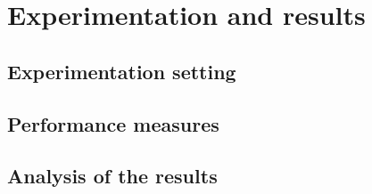 \section{Experimentation and results}

\subsection{Experimentation setting}

\subsection{Performance measures}

\subsection{Analysis of the results}

